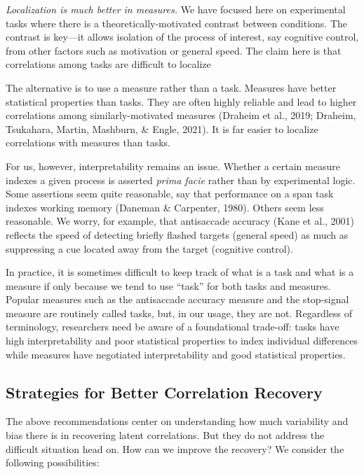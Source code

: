 \documentclass[
  ,man]{apa6}
\begin{document}
\emph{Localization is much better in measures.} We have focused here on experimental tasks where there is a theoretically-motivated contrast between conditions. The contrast is key---it allows isolation of the process of interest, say cognitive control, from other factors such as motivation or general speed. The claim here is that correlations among tasks are difficult to localize

The alternative is to use a measure rather than a task. Measures have better statistical properties than tasks. They are often highly reliable and lead to higher correlations among similarly-motivated measures (Draheim et al., 2019; Draheim, Tsukahara, Martin, Mashburn, \& Engle, 2021). It is far easier to localize correlations with measures than tasks.

For us, however, interpretability remains an issue. Whether a certain measure indexes a given process is asserted \emph{prima facie} rather than by experimental logic. Some assertions seem quite reasonable, say that performance on a span task indexes working memory (Daneman \& Carpenter, 1980). Others seem less reasonable. We worry, for example, that antisaccade accuracy (Kane et al., 2001) reflects the speed of detecting briefly flashed targets (general speed) as much as suppressing a cue located away from the target (cognitive control).

In practice, it is sometimes difficult to keep track of what is a task and what is a measure if only because we tend to use ``task'' for both tasks and measures. Popular measures such as the antisaccade accuracy measure and the stop-signal measure are routinely called tasks, but, in our usage, they are not. Regardless of terminology, researchers need be aware of a foundational trade-off: tasks have high interpretability and poor statistical properties to index individual differences while measures have negotiated interpretability and good statistical properties.

\hypertarget{strategies-for-better-correlation-recovery}{%
\subsection{Strategies for Better Correlation Recovery}\label{strategies-for-better-correlation-recovery}}

The above recommendations center on understanding how much variability and bias there is in recovering latent correlations. But they do not address the difficult situation head on. How can we improve the recovery? We consider the following possibilities:
\end{document}
